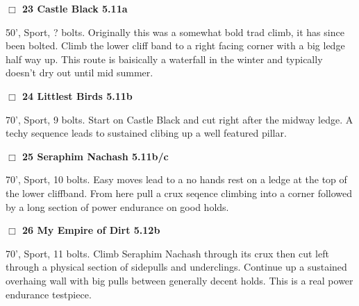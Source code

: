 	\begin{multicols}{2}


\needspace{2em}
\label{rt:Castle Black}
\colorbox{RoyalBlue!20}{
\parbox{0.95\linewidth}{
\hspace{-1ex}\textbf{$\Box$
23 Castle Black 5.11a  
}}}
\begin{adjustwidth}{1.3em}{}			

50', Sport, ? bolts. Originally this was a somewhat bold trad climb, it has since been bolted. Climb the lower cliff band to a right facing corner with a big ledge half way up. This route is baisically a waterfall in the winter and typically doesn't dry out until mid summer.
\end{adjustwidth}




\needspace{2em}
\label{rt:Littlest Birds}
\colorbox{RoyalBlue!20}{
\parbox{0.95\linewidth}{
\hspace{-1ex}\textbf{$\Box$
24 Littlest Birds 5.11b  
}}}
\begin{adjustwidth}{1.3em}{}			

70', Sport, 9 bolts. Start on Castle Black and cut right after the midway ledge. A techy sequence leads to sustained clibing up a well featured pillar.
\end{adjustwidth}




\needspace{2em}
\label{rt:Seraphim Nachash}
\colorbox{RoyalBlue!20}{
\parbox{0.95\linewidth}{
\hspace{-1ex}\textbf{$\Box$
25 Seraphim Nachash 5.11b/c  
}}}
\begin{adjustwidth}{1.3em}{}			

70', Sport, 10 bolts. Easy moves lead to a no hands rest on a ledge at the top of the lower cliffband. From here pull a crux seqence climbing into a corner followed by a long section of power endurance on good holds.
\end{adjustwidth}




\needspace{2em}
\label{rt:My Empire of Dirt}
\colorbox{Goldenrod!20}{
\parbox{0.95\linewidth}{
\hspace{-1ex}\textbf{$\Box$
26 My Empire of Dirt 5.12b  
}}}
\begin{adjustwidth}{1.3em}{}			

70', Sport, 11 bolts. Climb Seraphim Nachash through its crux then cut left through a physical section of sidepulls and underclings. Continue up a sustained overhaing wall with big pulls between generally decent holds. This is a real power endurance testpiece.
\end{adjustwidth}




\label{tp:Garden Cliff Nest Area}
	\end{multicols}
